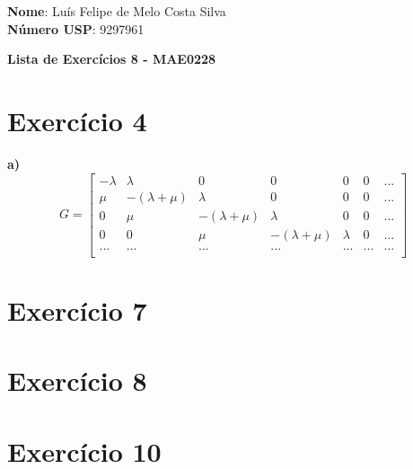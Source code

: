 \documentclass[12pt]{article}
\begin{document}
	
	\textbf{Nome}: Luís Felipe de Melo Costa Silva \\
	\textbf{Número USP}: 9297961 
	
	\begin{center}
		\LARGE \bf
		Lista de Exercícios 8 - MAE0228
	\end{center}
	 
	\section*{Exercício 4}
	
	\textbf{a)} $$
	G = \left[\begin{array}{ccccccc}
	          -\lambda  & \lambda          & 0                & 0                & 0       & 0   & ... \\
	          \mu       &  -(\lambda+\mu)  & \lambda          & 0                & 0       & 0   & ... \\
	          0         & \mu              &  -(\lambda+\mu)  & \lambda          & 0       & 0   & ... \\
	          0         & 0                & \mu              &  -(\lambda+\mu)  & \lambda & 0   & ... \\ 
	          ...       & ...              & ...              &  ...             & ...     & ... & ... \\
	    \end{array}\right]
	$$
	
	\section*{Exercício 7}
	\section*{Exercício 8}
	\section*{Exercício 10}
	 
\end{document}
